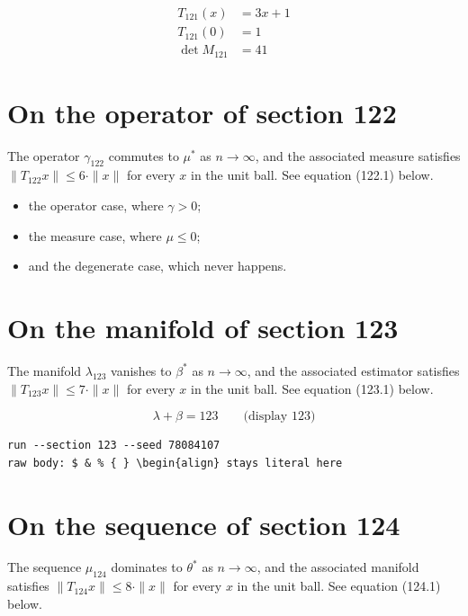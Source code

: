 \documentclass{article}
\begin{document}
\begin{align}
T_{121}(x) &= 3 x + 1 \\
T_{121}(0) &= 1 \\
\det M_{121} &= 41
\end{align}

\section{On the operator of section 122}
The operator $\gamma_{122}$ commutes to $\mu^{*}$ as $n \to \infty$,
and the associated measure satisfies $\|T_{122} x\| \leq 6 \cdot \|x\|$
for every $x$ in the unit ball. See equation (122.1) below.

\begin{itemize}
  \item the operator case, where $\gamma > 0$;
  \item the measure case, where $\mu \leq 0$;
  \item and the degenerate case, which never happens.
\end{itemize}

\section{On the manifold of section 123}
The manifold $\lambda_{123}$ vanishes to $\beta^{*}$ as $n \to \infty$,
and the associated estimator satisfies $\|T_{123} x\| \leq 7 \cdot \|x\|$
for every $x$ in the unit ball. See equation (123.1) below.

$$
\lambda + \beta = 123 \qquad \text{(display 123)}
$$

\begin{verbatim}
run --section 123 --seed 78084107
raw body: $ & % { } \begin{align} stays literal here
\end{verbatim}

\section{On the sequence of section 124}
The sequence $\mu_{124}$ dominates to $\theta^{*}$ as $n \to \infty$,
and the associated manifold satisfies $\|T_{124} x\| \leq 8 \cdot \|x\|$
for every $x$ in the unit ball. See equation (124.1) below.
\end{document}
